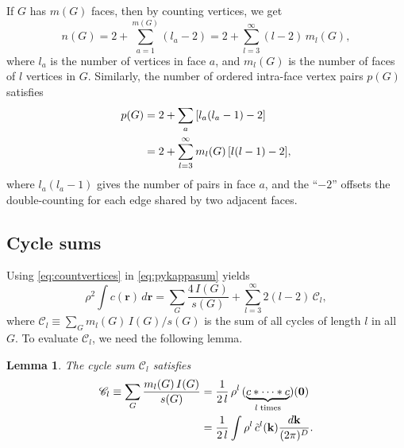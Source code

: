 \documentclass[aip,jcp,reprint,superscriptaddress]{revtex4-1}
\newtheorem{lemm}[thrm]{Lemma}
\newcommand{\vct}[1]{\mathbf{#1}}
\providecommand{\vr}{} %
\renewcommand{\vr}{\vct{r}}
\newcommand{\vk}{\vct{k}}
\newcommand{\dvk}{\frac{d\vk}{(2\pi)^D}}
\newcommand{\Chn}{\mathscr{C}}
\begin{document}
If $G$ has $m(G)$ faces, then by counting vertices, we get
%
\begin{equation}
  n(G) = 2 + \sum_{a = 1}^{m(G)} (l_a - 2)
       = 2 + \sum_{l = 3}^\infty (l - 2) \, m_l(G),
\label{eq:countvertices}
\end{equation}
%
where
  $l_a$ is the number of vertices in face $a$,
%
and
  $m_l(G)$ is the number of faces of $l$ vertices in $G$.
%
Similarly, the number of ordered intra-face vertex pairs
  $p(G)$ satisfies
%
\begin{align}
  p(G)  &= 2 + \sum_{a} \left[ l_a (l_a - 1) - 2 \right]
                        \notag \\
        &= 2 + \sum_{l = 3}^\infty m_l(G) \, [l(l-1) - 2],
\label{eq:countpairs}
\end{align}
%
where $l_a (l_a - 1)$ gives the number of pairs in face $a$,
  and the ``$-2$'' %
  offsets the double-counting
  for each edge shared by two adjacent faces.




\subsection{Cycle sums}

Using \eqref{eq:countvertices} in \eqref{eq:pykappasum} yields
%
\begin{equation}
    \rho^2 \int c(\vr) \, d\vr
  = \sum_G \frac{ 4 \, I(G) }{ s(G) }
  + \sum_{l = 3}^\infty 2 (l - 2) \, \Chn_l,
\label{eq:pyintgcr2sums}
\end{equation}
%
where
$\Chn_l \equiv \sum_G m_l(G) \, I(G) / s(G)$
is the sum of all cycles of length $l$ in all $G$.
%
To evaluate $\Chn_l$, we need the following lemma.

\begin{lemm}
The cycle sum $\Chn_l$ satisfies
\begin{align}
      \Chn_l
  \equiv
      \sum_G \frac{ m_l(G) \, I(G) } { s(G) }
  &=  \frac{1}{2 \, l} \,
      \rho^l \, (\underbrace{c*\cdots *c}_{l \; \mathrm{times}})(\vct 0)
      \notag \\
  &=  \frac{1}{2 \, l}
      \int \rho^l \, \tilde{c}^l(\vk) \dvk.
\label{eq:ccycling}
\end{align}
%
\end{lemm}
\end{document}
